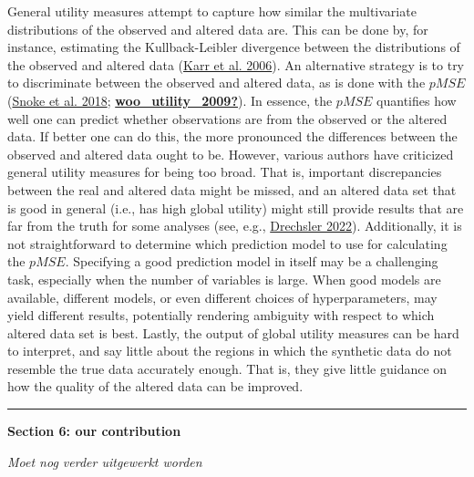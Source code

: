 \documentclass[
]{article}
\begin{document}
General utility measures attempt to capture how similar the multivariate
distributions of the observed and altered data are. This can be done by,
for instance, estimating the Kullback-Leibler divergence between the
distributions of the observed and altered data
(\protect\hyperlink{ref-karr_utility_2006}{Karr et al. 2006}). An
alternative strategy is to try to discriminate between the observed and
altered data, as is done with the \(pMSE\)
(\protect\hyperlink{ref-snoke_utility_2018}{Snoke et al. 2018};
\protect\hyperlink{ref-woo_utility_2009}{\textbf{woo\_utility\_2009?}}).
In essence, the \(pMSE\) quantifies how well one can predict whether
observations are from the observed or the altered data. If better one
can do this, the more pronounced the differences between the observed
and altered data ought to be. However, various authors have criticized
general utility measures for being too broad. That is, important
discrepancies between the real and altered data might be missed, and an
altered data set that is good in general (i.e., has high global utility)
might still provide results that are far from the truth for some
analyses (see, e.g.,
\protect\hyperlink{ref-drechsler_utility_2022}{Drechsler 2022}).
Additionally, it is not straightforward to determine which prediction
model to use for calculating the \(pMSE\). Specifying a good prediction
model in itself may be a challenging task, especially when the number of
variables is large. When good models are available, different models, or
even different choices of hyperparameters, may yield different results,
potentially rendering ambiguity with respect to which altered data set
is best. Lastly, the output of global utility measures can be hard to
interpret, and say little about the regions in which the synthetic data
do not resemble the true data accurately enough. That is, they give
little guidance on how the quality of the altered data can be improved.

\begin{center}\rule{0.5\linewidth}{0.5pt}\end{center}

\textbf{Section 6: our contribution}

\emph{Moet nog verder uitgewerkt worden}
\end{document}
